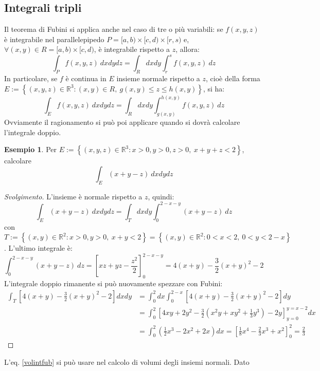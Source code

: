 \documentclass[11pt, a4paper]{scrartcl}
\newenvironment{svolgimento}{\renewcommand\qedsymbol{$\blacksquare$}\begin{proof}[Svolgimento]}{\end{proof}}
\theoremstyle{definition}
\newtheorem{esempio}{Esempio}
\numberwithin{esempio}{section}
\theoremstyle{definition}
\numberwithin{obs}{section}
\numberwithin{nota}{section}
\numberwithin{equation}{subsection}
\begin{document}
\subsection{Integrali tripli}
Il teorema di Fubini si applica anche nel caso di tre o pi\`u variabili: se $f(x,y,z)$ \`e integrabile nel parallelepipedo $P = [a,b) \times [c,d) \times [r,s)$ e, $\forall (x,y) \in R = [a,b) \times [c,d)$, \`e integrabile rispetto a $z$, allora:
\[
\int_{P} f(x,y,z) \ dxdydz = \int_{R} dxdy \int_{r} ^s f(x,y,z) \ dz
\] 
In particolare, se $f$ \`e continua in $E$ insieme normale rispetto a $z$, cio\`e della forma $E:= \left\{ (x,y,z) \in \mathbb{R}^3 : (x,y) \in R, \ g(x,y)\le z \le h(x,y) \right\} $, si ha:
\begin{equation}\label{volintfub}
	\int_{E} f(x,y,z) \ dxdydz = \int_{R} dxdy \int_{g(x,y)} ^{h(x,y)} f(x,y,z) \ dz
\end{equation}
Ovviamente il ragionamento si pu\`o poi applicare quando si dovr\`a calcolare l'integrale doppio.
\begin{esempio}
Per $E:=\left\{ (x,y,z) \in \mathbb{R}^3 : x>0,y>0,z>0, \ x+y+z < 2\right\} $, calcolare
\[
\int_{E} (x+y-z) \ dxdydz
\] 
\begin{svolgimento}
	L'insieme \`e normale rispetto a $z$, quindi:
	\[
	\int_{E} (x+y-z) \ dxdydz = \int_{T} dxdy \int_{0} ^{2-x-y}  (x+y-z) \ dz
	\] 
	con $T:= \left\{ (x,y) \in \mathbb{R}^2:x>0,y>0, \ x+y <2 \right\} = \left\{ (x,y) \in \mathbb{R}^2 : 0<x<2, \ 0<y<2-x \right\}  $. 
	L'ultimo integrale \`e:
	\[
	\int_{0} ^{2-x-y} (x+y-z) \ dz = \left[ xz + yz - \frac{z^2}{2} \right] _{0} ^{2-x-y}  = 4(x+y) - \frac{3}{2}(x+y)^2 - 2
	\] 
	L'integrale doppio rimanente si pu\`o nuovamente spezzare con Fubini:
	\[
	\begin{split}
		\int_{T} \left[ 4(x+y) - \frac{3}{2}(x+y)^2 - 2\right]  dxdy &= \int_{0} ^2 dx \int_{0} ^{2- x} \left[ 4(x+y) - \frac{3}{2}(x+y)^2 - 2\right] dy\\
									     &=\int_{0} ^2 \left[ 4xy + 2y^2 - \frac{3}{2}\left(x^2 y + xy^2  + \frac{1}{3}y^3\right) -2y \right] _{y=0} ^{y= x-2} dx \\
									     &=\int_{0} ^2 \left(\frac{1}{2}x^3 - 2 x^2 + 2x\right) dx = \left[ \frac{1}{8} x^4 - \frac{2}{3}x^3 + x^2\right] _0^2= \frac{2}{3}
	\end{split}
	\] 
	
\end{svolgimento}
\end{esempio}
\noindent L'eq. \ref{volintfub} si pu\`o usare nel calcolo di volumi degli insiemi normali. Dato 
\end{document}
